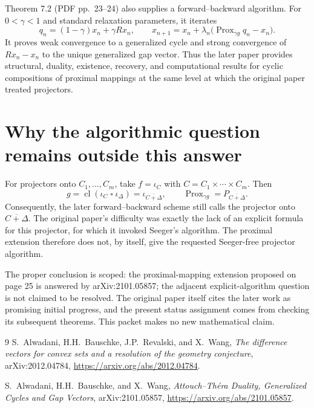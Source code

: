 \documentclass[11pt]{article}
\newcommand{\Prox}{\operatorname{Prox}}
\newcommand{\cl}{\operatorname{cl}}
\newcommand{\ii}{\iota}
\begin{document}
Theorem 7.2 (PDF pp.~23--24) also supplies a forward--backward algorithm.
For $0<\gamma<1$ and standard relaxation parameters, it iterates
\[
 q_n=(1-\gamma)x_n+\gamma Rx_n,
 \qquad
 x_{n+1}=x_n+\lambda_n\bigl(\Prox_{\gamma g}q_n-x_n\bigr).
\]
It proves weak convergence to a generalized cycle and strong convergence of
$Rx_n-x_n$ to the unique generalized gap vector.  Thus the later paper
provides structural, duality, existence, recovery, and computational results
for cyclic compositions of proximal mappings at the same level at which the
original paper treated projectors.

\section*{Why the algorithmic question remains outside this answer}

For projectors onto $C_1,\ldots,C_m$, take
$f=\ii_C$ with $C=C_1\times\cdots\times C_m$.  Then
\[
 g=\cl(\ii_C\mathbin{\square}\ii_\Delta)
   =\ii_{\overline{C+\Delta}},
 \qquad
 \Prox_{\gamma g}=P_{\overline{C+\Delta}}.
\]
Consequently, the later forward--backward scheme still calls the projector
onto $\overline{C+\Delta}$.  The original paper's difficulty was exactly the
lack of an explicit formula for this projector, for which it invoked
Seeger's algorithm.  The proximal extension therefore does not, by itself,
give the requested Seeger-free projector algorithm.

The proper conclusion is scoped: the proximal-mapping extension proposed on
page 25 is answered by arXiv:2101.05857; the adjacent explicit-algorithm
question is not claimed to be resolved.  The original paper itself cites the
later work as promising initial progress, and the present status assignment
comes from checking its subsequent theorems.  This packet makes no new
mathematical claim.

\begin{thebibliography}{9}
S.~Alwadani, H.H.~Bauschke, J.P.~Revalski, and X.~Wang,
\emph{The difference vectors for convex sets and a resolution of the
geometry conjecture}, arXiv:2012.04784,
\url{https://arxiv.org/abs/2012.04784}.

S.~Alwadani, H.H.~Bauschke, and X.~Wang,
\emph{Attouch--Th\'era Duality, Generalized Cycles and Gap Vectors},
arXiv:2101.05857,
\url{https://arxiv.org/abs/2101.05857}.
\end{thebibliography}
\end{document}
